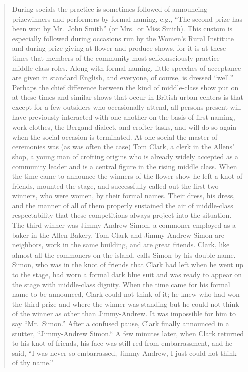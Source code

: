 \documentclass[twoside,symmetric,nobib,justified]{tufte-book}
\begin{document}
\begin{quote}
During socials the practice is sometimes followed of announcing
prizewinners and performers by formal naming, e.g., ``The second prize
has been won by Mr.~John Smith'' (or Mrs.~or Miss Smith). This custom is
especially followed during occasions run by the Women's Rural Institute
and during prize-giving at flower and produce shows, for it is at these
times that members of the community most selfconsciously practice
middle-class roles. Along with formal naming, little speeches of
acceptance are given in standard English, and everyone, of course, is
dressed ``well.'' Perhaps the chief difference between the kind of
middle-class show put on at these times and similar shows that occur in
British urban centers is that except for a few outsiders who
occasionally attend, all persons present will have previously interacted
with one another on the basis of first-naming, work clothes, the Bergand
dialect, and crofter tasks, and will do so again when the social
occasion is terminated. At one social the master of ceremonies was (as
was often the case) Tom Clark, a clerk in the Allens' shop, a young man
of crofting origins who is already widely accepted as a community leader
and is a central figure in the rising middle class. When the time came
to announce the winners of the flower show he left a knot of friends,
mounted the stage, and successfully called out the first two winners,
who were women, by their formal names. Their dress, his dress, and the
manner of all of them properly sustained the air of middle-class
respectability that these competitions always project into the
situation. The third winner was Jimmy-Andrew Simon, a commoner employed
as a baker in the Allen Bakery. Tom Clark and Jimmy-Andrew Simon are
neighbors, work in the same building, and are great friends. Clark, like
almost all the commoners on the island, calls Simon by his double name.
Simon, who was in the knot of friends that Clark had left when he went
up to the stage, had worn a formal dark blue suit and was ready to
appear on the stage with middle-class dignity. When the time came for
his formal name to be announced, Clark could not think of it; he knew
who had won the third prize and where the winner was standing but he
could not think of the winner as other than Jimmy-Andrew. It was
impossible for him to say ``Mr.~Simon.'' After a confused pause, Clark
finally announced in a stutter, ``Jimmy-Andrew Simon.`` A few minutes
later, when Clark returned to his knot of friends, his face was still
red from embarrassment, and he said, ``I was never so embarrassed,
Jimmy-Andrew, I just could not think of thy name.''
\end{quote}
\end{document}
